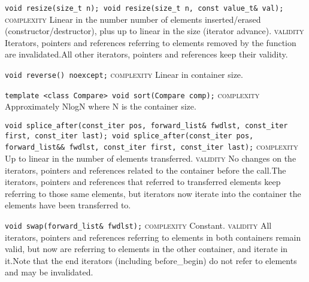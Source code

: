 \noindent{}\hspace*{0.25em}\lstinline[basicstyle=\ttfamily\color{corange}]{void resize(size_t n); void resize(size_t n, const value_t& val);} \textsc{complexity} Linear in the number number of elements inserted/erased (constructor/destructor), plus up to linear in the size (iterator advance). \textsc{validity} Iterators, pointers and references referring to elements removed by the function are invalidated.All other iterators, pointers and references keep their validity.\\\vspace{-0.6em}

\noindent{}\hspace*{0.25em}\lstinline[basicstyle=\ttfamily\color{corange}]{void reverse() noexcept;} \textsc{complexity} Linear in container size.\\\vspace{-0.6em}

\noindent{}\hspace*{0.25em}\lstinline[basicstyle=\ttfamily\color{cred}]{template <class Compare> void sort(Compare comp);} \textsc{complexity} Approximately NlogN where N is the container size.\\\vspace{-0.6em}

\noindent{}\hspace*{0.25em}\lstinline[basicstyle=\ttfamily\color{corange}]{void splice_after(const_iter pos, forward_list& fwdlst, const_iter first, const_iter last); void splice_after(const_iter pos, forward_list&& fwdlst, const_iter first, const_iter last);} \textsc{complexity} Up to linear in the number of elements transferred. \textsc{validity} No changes on the iterators, pointers and references related to the container before the call.The iterators, pointers and references that referred to transferred elements keep referring to those same elements, but iterators now iterate into the container the elements have been transferred to.\\\vspace{-0.6em}

\noindent{}\hspace*{0.25em}\lstinline[basicstyle=\ttfamily\color{cgreen}]{void swap(forward_list& fwdlst);} \textsc{complexity} Constant. \textsc{validity} All iterators, pointers and references referring to elements in both containers remain valid, but now are referring to elements in the other container, and iterate in it.Note that the end iterators (including before\_begin) do not refer to elements and may be invalidated.\\\vspace{-0.6em}

